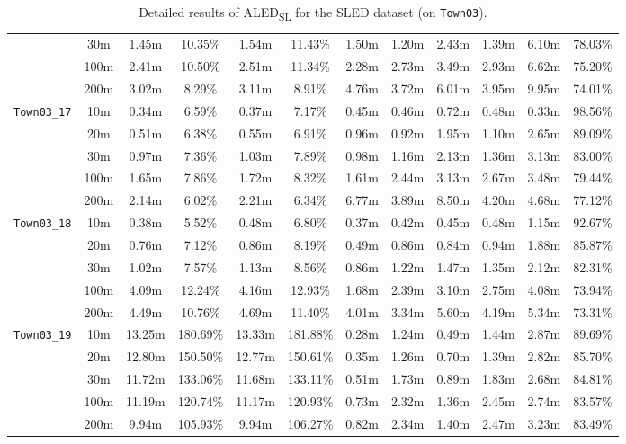 \begin{table}
{\begin{tabular}{@{}cccccccccccc@{}}
      & 30m & 1.45m & 10.35\% & 1.54m & 11.43\% & 1.50m & 1.20m & 2.43m & 1.39m & 6.10m & 78.03\% \\
      & 100m & 2.41m & 10.50\% & 2.51m & 11.34\% & 2.28m & 2.73m & 3.49m & 2.93m & 6.62m & 75.20\% \\
      & 200m & 3.02m & 8.29\% & 3.11m & 8.91\% & 4.76m & 3.72m & 6.01m & 3.95m & 9.95m & 74.01\% \\
      \midrule
      \multirow{5}{*}{\Verb|Town03_17|} & 10m & 0.34m & 6.59\% & 0.37m & 7.17\% & 0.45m & 0.46m & 0.72m & 0.48m & 0.33m & 98.56\% \\
      & 20m & 0.51m & 6.38\% & 0.55m & 6.91\% & 0.96m & 0.92m & 1.95m & 1.10m & 2.65m & 89.09\% \\
      & 30m & 0.97m & 7.36\% & 1.03m & 7.89\% & 0.98m & 1.16m & 2.13m & 1.36m & 3.13m & 83.00\% \\
      & 100m & 1.65m & 7.86\% & 1.72m & 8.32\% & 1.61m & 2.44m & 3.13m & 2.67m & 3.48m & 79.44\% \\
      & 200m & 2.14m & 6.02\% & 2.21m & 6.34\% & 6.77m & 3.89m & 8.50m & 4.20m & 4.68m & 77.12\% \\
      \midrule
      \multirow{5}{*}{\Verb|Town03_18|} & 10m & 0.38m & 5.52\% & 0.48m & 6.80\% & 0.37m & 0.42m & 0.45m & 0.48m & 1.15m & 92.67\% \\
      & 20m & 0.76m & 7.12\% & 0.86m & 8.19\% & 0.49m & 0.86m & 0.84m & 0.94m & 1.88m & 85.87\% \\
      & 30m & 1.02m & 7.57\% & 1.13m & 8.56\% & 0.86m & 1.22m & 1.47m & 1.35m & 2.12m & 82.31\% \\
      & 100m & 4.09m & 12.24\% & 4.16m & 12.93\% & 1.68m & 2.39m & 3.10m & 2.75m & 4.08m & 73.94\% \\
      & 200m & 4.49m & 10.76\% & 4.69m & 11.40\% & 4.01m & 3.34m & 5.60m & 4.19m & 5.34m & 73.31\% \\
      \midrule
      \multirow{5}{*}{\Verb|Town03_19|} & 10m & 13.25m & 180.69\% & 13.33m & 181.88\% & 0.28m & 1.24m & 0.49m & 1.44m & 2.87m & 89.69\% \\
      & 20m & 12.80m & 150.50\% & 12.77m & 150.61\% & 0.35m & 1.26m & 0.70m & 1.39m & 2.82m & 85.70\% \\
      & 30m & 11.72m & 133.06\% & 11.68m & 133.11\% & 0.51m & 1.73m & 0.89m & 1.83m & 2.68m & 84.81\% \\
      & 100m & 11.19m & 120.74\% & 11.17m & 120.93\% & 0.73m & 2.32m & 1.36m & 2.45m & 2.74m & 83.57\% \\
      & 200m & 9.94m & 105.93\% & 9.94m & 106.27\% & 0.82m & 2.34m & 1.40m & 2.47m & 3.23m & 83.49\% \\
      \bottomrule
    \end{tabular}
  }
  \cprotect\caption{Detailed results of ALED\textsubscript{SL} for the SLED dataset (on \verb|Town03|).}\label{tab:appendix:aled:full_res_sled_town03}
\end{table}


